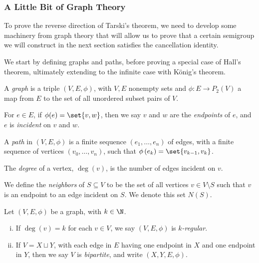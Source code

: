 \documentclass[10pt]{mypackage2}
\begin{document}
\subsubsection{A Little Bit of Graph Theory}%
To prove the reverse direction of Tarski's theorem, we need to develop some machinery from graph theory that will allow us to prove that a certain semigroup we will construct in the next section satisfies the cancellation identity.\newline

We start by defining graphs and paths, before proving a special case of Hall's theorem, ultimately extending to the infinite case with König's theorem.
\begin{definition}
  A \textit{graph} is a triple $\left(V,E,\phi\right)$, with $V,E$ nonempty sets and $\phi\colon E\rightarrow P_{2}(V)$ a map from $E$ to the set of all unordered subset pairs of $V$.\newline

  For $e\in E$, if $\phi(e) = \set{v,w}$, then we say $v$ and $w$ are the \textit{endpoints} of $e$, and $e$ is \textit{incident} on $v$ and $w$.\newline

  A \textit{path} in $\left(V,E,\phi\right)$ is a finite sequence $\left(e_1,\dots,e_n\right)$ of edges, with a finite sequence of vertices $\left(v_0,\dots,v_n\right)$, such that $\phi\left(e_k\right) = \set{v_{k-1},v_k}$.\newline

  The \textit{degree} of a vertex, $\deg(v)$, is the number of edges incident on $v$.\newline

  We define the \textit{neighbors} of $S\subseteq V$ to be the set of all vertices $v\in V\setminus S$ such that $v$ is an endpoint to an edge incident on $S$. We denote this set $N(S)$.
\end{definition}

\begin{definition}
  Let $\left(V,E,\phi\right)$ be a graph, with $k\in \N$.
  \begin{enumerate}[(i)]
    \item If $\deg(v) = k$ for each $v\in V$, we say $\left(V,E,\phi\right)$ is \textit{$k$-regular}.
    \item If $V = X\sqcup Y$, with each edge in $E$ having one endpoint in $X$ and one endpoint in $Y$, then we say $V$ is \textit{bipartite}, and write $\left(X,Y,E,\phi\right)$.
  \end{enumerate}
\end{definition}
\end{document}
